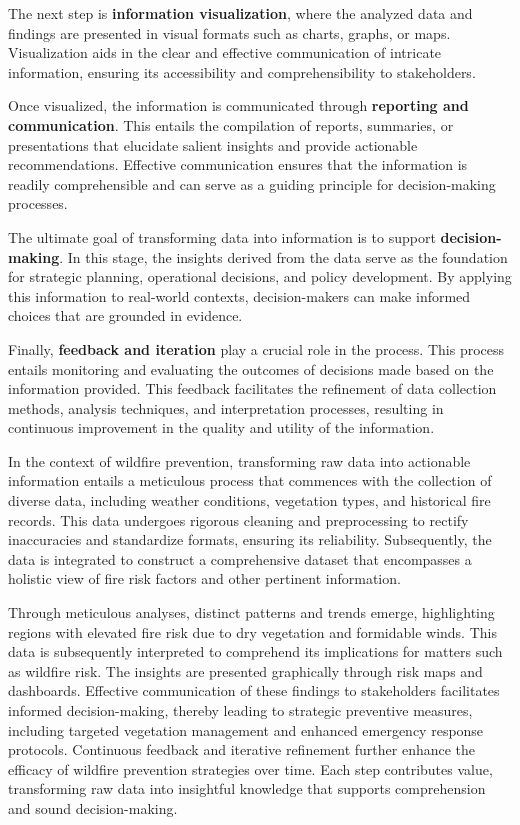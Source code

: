 \documentclass[
  12 pt,
]{Nemilov}
\begin{document}
The next step is \textbf{information visualization}, where the analyzed data and findings are presented in visual formats such as charts, graphs, or maps. Visualization aids in the clear and effective communication of intricate information, ensuring its accessibility and comprehensibility to stakeholders.

Once visualized, the information is communicated through \textbf{reporting and communication}. This entails the compilation of reports, summaries, or presentations that elucidate salient insights and provide actionable recommendations. Effective communication ensures that the information is readily comprehensible and can serve as a guiding principle for decision-making processes.

The ultimate goal of transforming data into information is to support \textbf{decision-making}. In this stage, the insights derived from the data serve as the foundation for strategic planning, operational decisions, and policy development. By applying this information to real-world contexts, decision-makers can make informed choices that are grounded in evidence.

Finally, \textbf{feedback and iteration} play a crucial role in the process. This process entails monitoring and evaluating the outcomes of decisions made based on the information provided. This feedback facilitates the refinement of data collection methods, analysis techniques, and interpretation processes, resulting in continuous improvement in the quality and utility of the information.

In the context of wildfire prevention, transforming raw data into actionable information entails a meticulous process that commences with the collection of diverse data, including weather conditions, vegetation types, and historical fire records. This data undergoes rigorous cleaning and preprocessing to rectify inaccuracies and standardize formats, ensuring its reliability. Subsequently, the data is integrated to construct a comprehensive dataset that encompasses a holistic view of fire risk factors and other pertinent information.

Through meticulous analyses, distinct patterns and trends emerge, highlighting regions with elevated fire risk due to dry vegetation and formidable winds. This data is subsequently interpreted to comprehend its implications for matters such as wildfire risk. The insights are presented graphically through risk maps and dashboards. Effective communication of these findings to stakeholders facilitates informed decision-making, thereby leading to strategic preventive measures, including targeted vegetation management and enhanced emergency response protocols. Continuous feedback and iterative refinement further enhance the efficacy of wildfire prevention strategies over time. Each step contributes value, transforming raw data into insightful knowledge that supports comprehension and sound decision-making.
\end{document}
